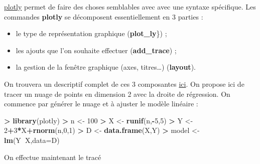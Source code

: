 \documentclass[]{article}
\newenvironment{Shaded}{\begin{snugshade}}{\end{snugshade}}
\newcommand{\DataTypeTok}[1]{\textcolor[rgb]{0.13,0.29,0.53}{#1}}
\newcommand{\DecValTok}[1]{\textcolor[rgb]{0.00,0.00,0.81}{#1}}
\newcommand{\KeywordTok}[1]{\textcolor[rgb]{0.13,0.29,0.53}{\textbf{#1}}}
\newcommand{\NormalTok}[1]{#1}
\newcommand{\OperatorTok}[1]{\textcolor[rgb]{0.81,0.36,0.00}{\textbf{#1}}}
\newcommand{\StringTok}[1]{\textcolor[rgb]{0.31,0.60,0.02}{#1}}
\providecommand{\tightlist}{%
  \setlength{\itemsep}{0pt}\setlength{\parskip}{0pt}}
\theoremstyle{definition}
\theoremstyle{definition}
\theoremstyle{definition}
\theoremstyle{remark}
\begin{document}
\href{https://plot.ly/r/}{plotly} permet de faire des choses semblables avec avec une syntaxe spécifique. Les commandes \textbf{plotly} se décomposent essentiellement en 3 parties :

\begin{itemize}
\tightlist
\item
  le type de représentation graphique (\textbf{plot\_ly}\}) ;
\item
  les ajouts que l'on souhaite effectuer (\textbf{add\_trace}) ;
\item
  la gestion de la fenêtre graphique (axes, titres\ldots{}) (\textbf{layout}).
\end{itemize}

On trouvera un descriptif complet de ces 3 composantes \href{https://plot.ly/r/reference/}{ici}. On propose ici de tracer un nuage de points en dimension 2 avec la droite de régression. On commence par générer le nuage et à ajuster le modèle linéaire :

\begin{Shaded}
\begin{Highlighting}[]
\OperatorTok{>}\StringTok{ }\KeywordTok{library}\NormalTok{(plotly)}
\OperatorTok{>}\StringTok{ }\NormalTok{n <-}\StringTok{ }\DecValTok{100}
\OperatorTok{>}\StringTok{ }\NormalTok{X <-}\StringTok{ }\KeywordTok{runif}\NormalTok{(n,}\OperatorTok{-}\DecValTok{5}\NormalTok{,}\DecValTok{5}\NormalTok{)}
\OperatorTok{>}\StringTok{ }\NormalTok{Y <-}\StringTok{ }\DecValTok{2}\OperatorTok{+}\DecValTok{3}\OperatorTok{*}\NormalTok{X}\OperatorTok{+}\KeywordTok{rnorm}\NormalTok{(n,}\DecValTok{0}\NormalTok{,}\DecValTok{1}\NormalTok{)}
\OperatorTok{>}\StringTok{ }\NormalTok{D <-}\StringTok{ }\KeywordTok{data.frame}\NormalTok{(X,Y)}
\OperatorTok{>}\StringTok{ }\NormalTok{model <-}\StringTok{ }\KeywordTok{lm}\NormalTok{(Y}\OperatorTok{~}\NormalTok{X,}\DataTypeTok{data=}\NormalTok{D)}
\end{Highlighting}
\end{Shaded}

On effectue maintenant le tracé
\end{document}
